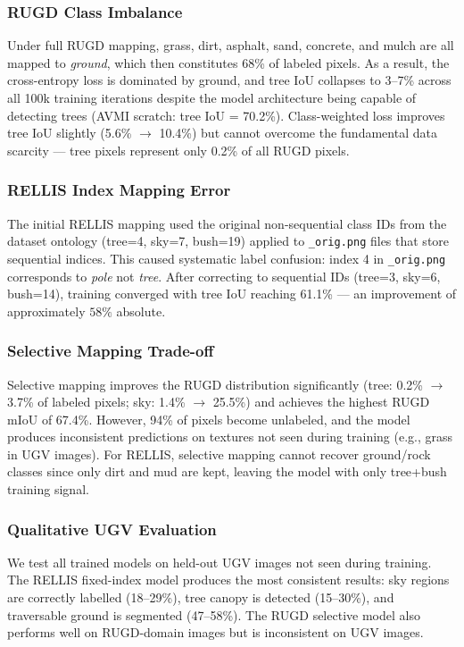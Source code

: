 \documentclass[conference]{IEEEtran}
\begin{document}
\subsubsection{RUGD Class Imbalance}
Under full RUGD mapping, grass, dirt, asphalt, sand, concrete, and mulch are all mapped to \textit{ground}, which then constitutes 68\% of labeled pixels. As a result, the cross-entropy loss is dominated by ground, and tree IoU collapses to 3--7\% across all 100k training iterations despite the model architecture being capable of detecting trees (AVMI scratch: tree IoU = 70.2\%). Class-weighted loss improves tree IoU slightly (5.6\% $\rightarrow$ 10.4\%) but cannot overcome the fundamental data scarcity — tree pixels represent only 0.2\% of all RUGD pixels.

\subsubsection{RELLIS Index Mapping Error}
The initial RELLIS mapping used the original non-sequential class IDs from the dataset ontology (tree=4, sky=7, bush=19) applied to \texttt{\_orig.png} files that store sequential indices. This caused systematic label confusion: index 4 in \texttt{\_orig.png} corresponds to \textit{pole} not \textit{tree}. After correcting to sequential IDs (tree=3, sky=6, bush=14), training converged with tree IoU reaching 61.1\% — an improvement of approximately $58\%$ absolute.

\subsubsection{Selective Mapping Trade-off}
Selective mapping improves the RUGD distribution significantly (tree: 0.2\% $\rightarrow$ 3.7\% of labeled pixels; sky: 1.4\% $\rightarrow$ 25.5\%) and achieves the highest RUGD mIoU of 67.4\%. However, 94\% of pixels become unlabeled, and the model produces inconsistent predictions on textures not seen during training (e.g., grass in UGV images). For RELLIS, selective mapping cannot recover ground/rock classes since only dirt and mud are kept, leaving the model with only tree+bush training signal.

\subsubsection{Qualitative UGV Evaluation}
We test all trained models on held-out UGV images not seen during training. The RELLIS fixed-index model produces the most consistent results: sky regions are correctly labelled (18--29\%), tree canopy is detected (15--30\%), and traversable ground is segmented (47--58\%). The RUGD selective model also performs well on RUGD-domain images but is inconsistent on UGV images.
\end{document}
